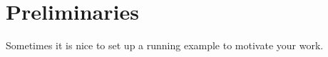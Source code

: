 \section{Preliminaries}
\label{sec:prelim}
Sometimes it is nice to set up a running example to motivate your work.